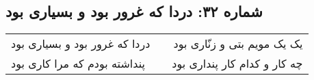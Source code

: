 \begin{center}
\section*{شماره ۳۲: دردا که غرور بود و بسیاری بود}
\label{sec:032}
\begin{longtable}{l p{0.5cm} r}
دردا که غرور بود و بسیاری بود
&&
یک یک مویم بتی و زنّاری بود
\\
پنداشته بودم که مرا کاری بود
&&
چه کار و کدام کار پنداری بود
\\
\end{longtable}
\end{center}
